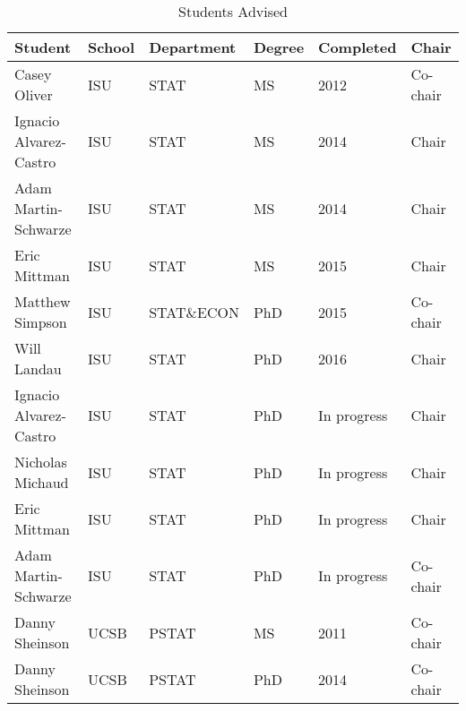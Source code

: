 \begin{table}[h]
\centering
\caption{Students Advised} 
\label{tab:advisees}
\begin{tabular}{llllll}
  \hline
Student & School & Department & Degree & Completed & Chair \\ 
  \hline
Casey Oliver & ISU & STAT & MS & 2012 & Co-chair \\ 
  Ignacio Alvarez-Castro & ISU & STAT & MS & 2014 & Chair \\ 
  Adam Martin-Schwarze & ISU & STAT & MS & 2014 & Chair \\ 
  Eric Mittman & ISU & STAT & MS & 2015 & Chair \\ 
  Matthew Simpson & ISU & STAT\&ECON & PhD & 2015 & Co-chair \\ 
  Will Landau & ISU & STAT & PhD & 2016 & Chair \\ 
  Ignacio Alvarez-Castro & ISU & STAT & PhD & In progress & Chair \\ 
  Nicholas Michaud & ISU & STAT & PhD & In progress & Chair \\ 
  Eric Mittman & ISU & STAT & PhD & In progress & Chair \\ 
  Adam Martin-Schwarze & ISU & STAT & PhD & In progress & Co-chair \\ 
  Danny Sheinson & UCSB & PSTAT & MS & 2011 & Co-chair \\ 
  Danny Sheinson & UCSB & PSTAT & PhD & 2014 & Co-chair \\ 
   \hline
\end{tabular}
\end{table}
